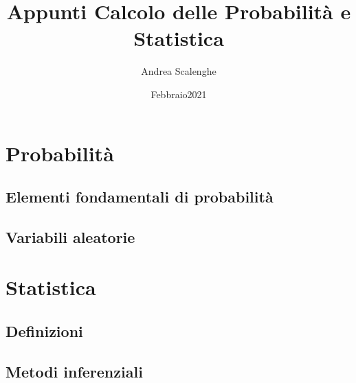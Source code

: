 \documentclass{book}
\theoremstyle{remark}
\theoremstyle{proposition}
\theoremstyle{definition}
\begin{document}
\title{Appunti Calcolo delle Probabilità e Statistica}
\author{Andrea Scalenghe}
\date{Febbraio2021}
\begin{titlepage}
\maketitle
\end{titlepage}
\setcounter{tocdepth}{2} %
\setcounter{secnumdepth}{3} %
\manualmark
\markboth{\spacedlowsmallcaps{\contentsname}}{\spacedlowsmallcaps{\contentsname}}
\tableofcontents
{}
\renewcommand{\chaptermark}[1]{\markboth{\spacedlowsmallcaps{#1}}{\spacedlowsmallcaps{#1}}}
\renewcommand{\sectionmark}[1]{\markright{\thesection\enspace\spacedlowsmallcaps{#1}}}
\newpage
\part{Probabilità}
\chapter{Elementi fondamentali di probabilità}

\newpage

\newpage

\newpage    

\newpage

\newpage
\chapter{Variabili aleatorie}

\newpage

\newpage





\newpage

\newpage

\newpage

\part{Statistica}
\chapter{Definizioni}

\newpage
\chapter{Metodi inferenziali}

\newpage

\newpage

\newpage

\newpage

\end{document}
